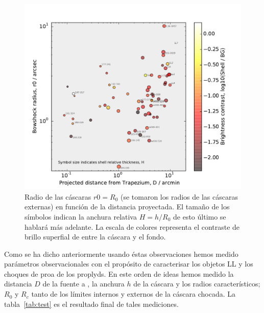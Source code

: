 \begin{figure}
  \centering
  \includegraphics[width=\linewidth]{luis-programas/will-r0-vs-D}
  \caption{Radio de las cáscaras \(r0 = R_{0}\) (se tomaron los radios de las cáscaras externas) en función de la distancia proyectada. El tamaño de los símbolos indican la anchura relativa \(H=h/R_{0}\) de esto último se hablará más adelante. La escala de colores representa el contraste de brillo superfial de \ha{} entre  la cáscara  y el fondo.}
  \label{fig:radio-cas}
\end{figure} 

Como se ha dicho anteriormente usando éstas observaciones  hemos medido parámetros observacionales con el propósito de caracterisar los objetos LL y los choques de proa de los proplyds. En este orden de ideas hemos medido la distancia \(D\) de la fuente a \thC{}, la anchura \(h\) de la cáscara y los radios característicos; \(R_{0}\) y \(R_{c}\) tanto de los límites internos y externos de la cáscara chocada. La tabla~\ref{tab:test} es el resultado final de tales mediciones.\\

